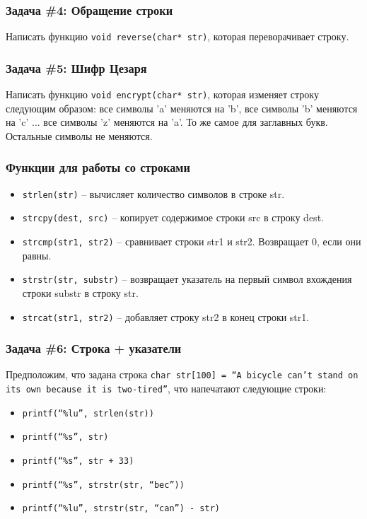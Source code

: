 \documentclass{article}
\begin{document}
\subsubsection*{\Squarepipe \quad Задача \#4: Обращение строки}
Написать функцию \texttt{void reverse(char* str)}, которая переворачивает строку.

\subsubsection*{\Squarepipe \quad Задача \#5: Шифр Цезаря}
Написать функцию \texttt{void encrypt(char* str)}, которая изменяет строку следующим образом: все символы 'a' меняются на 'b', все символы 'b' меняются на 'c' ... все символы 'z' меняются на 'a'. То же самое для заглавных букв. Остальные символы не меняются.

\subsubsection*{Функции для работы со строками}
\begin{itemize}
\item \texttt{strlen(str)} -- вычисляет количество символов в строке str.
\item \texttt{strcpy(dest, src)} -- копирует содержимое строки src в строку dest.
\item \texttt{strcmp(str1, str2)} -- сравнивает строки str1 и str2. Возвращает 0, если они равны.
\item \texttt{strstr(str, substr)} --  возвращает указатель на первый символ вхождения строки substr в строку str.
\item \texttt{strcat(str1, str2)} -- добавляет строку str2 в конец строки str1.
\end{itemize}
\subsubsection*{\Squarepipe \quad Задача \#6: Строка + указатели} Предположим, что задана строка \texttt{char str[100] = ``A bicycle can't stand on its own because it is two-tired''}, что напечатают следующие строки:
\begin{multicols}{2}
\begin{itemize}
\item \texttt{printf(``\%lu'', strlen(str))}
\item \texttt{printf(``\%s'', str)}
\item \texttt{printf(``\%s'', str + 33)}
\item \texttt{printf(``\%s'', strstr(str, ``bec''))}
\item \texttt{printf(``\%lu'', strstr(str, ``can'') - str)}
\end{itemize}
\end{multicols}
\end{document}
